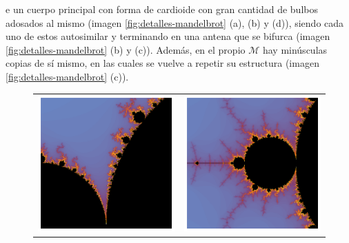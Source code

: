 e un cuerpo principal con forma de cardioide con gran cantidad de bulbos adosados al mismo (imagen \ref{fig:detalles-mandelbrot} (a), (b) y (d)), siendo cada uno de estos autosimilar y terminando en una antena que se bifurca (imagen \ref{fig:detalles-mandelbrot} (b) y (c)). Además, en el propio $\mathcal{M}$ hay minúsculas copias de sí mismo, en las cuales se vuelve a repetir su estructura (imagen \ref{fig:detalles-mandelbrot} (c)).

\begin{figure}[ht]
  \centering
  \begin{tabular}{cc}
    \includegraphics[scale=0.4]{./img/C3/mandelbrot-autosimilar-1.png} &   \includegraphics[scale=0.4]{./img/C3/mandelbrot-autosimilar-2.png} \\

\end{tabular}
\end{figure}
